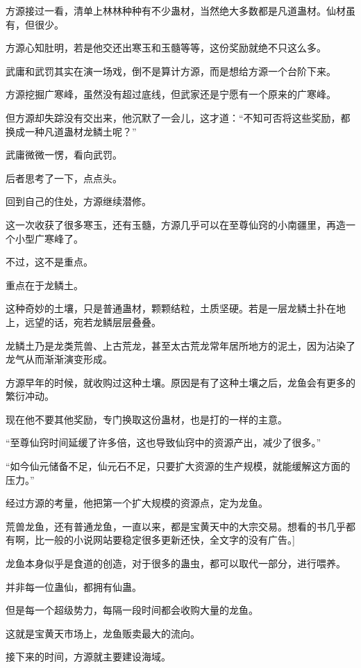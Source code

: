 
\begin{this_body}

方源接过一看，清单上林林种种有不少蛊材，当然绝大多数都是凡道蛊材。仙材虽有，但很少。

方源心知肚明，若是他交还出寒玉和玉髓等等，这份奖励就绝不只这么多。

武庸和武罚其实在演一场戏，倒不是算计方源，而是想给方源一个台阶下来。

方源挖掘广寒峰，虽然没有超过底线，但武家还是宁愿有一个原来的广寒峰。

但方源却失踪没有交出来，他沉默了一会儿，这才道：“不知可否将这些奖励，都换成一种凡道蛊材龙鳞土呢？”

武庸微微一愣，看向武罚。

后者思考了一下，点点头。

回到自己的住处，方源继续潜修。

这一次收获了很多寒玉，还有玉髓，方源几乎可以在至尊仙窍的小南疆里，再造一个小型广寒峰了。

不过，这不是重点。

重点在于龙鳞土。

这种奇妙的土壤，只是普通蛊材，颗颗结粒，土质坚硬。若是一层龙鳞土扑在地上，远望的话，宛若龙鳞层层叠叠。

龙鳞土乃是龙类荒兽、上古荒龙，甚至太古荒龙常年居所地方的泥土，因为沾染了龙气从而渐渐演变形成。

方源早年的时候，就收购过这种土壤。原因是有了这种土壤之后，龙鱼会有更多的繁衍冲动。

现在他不要其他奖励，专门换取这份蛊材，也是打的一样的主意。

“至尊仙窍时间延缓了许多倍，这也导致仙窍中的资源产出，减少了很多。”

“如今仙元储备不足，仙元石不足，只要扩大资源的生产规模，就能缓解这方面的压力。”

经过方源的考量，他把第一个扩大规模的资源点，定为龙鱼。

荒兽龙鱼，还有普通龙鱼，一直以来，都是宝黄天中的大宗交易。想看的书几乎都有啊，比一般的小说网站要稳定很多更新还快，全文字的没有广告。]

龙鱼本身似乎是食道的创造，对于很多的蛊虫，都可以取代一部分，进行喂养。

并非每一位蛊仙，都拥有仙蛊。

但是每一个超级势力，每隔一段时间都会收购大量的龙鱼。

这就是宝黄天市场上，龙鱼贩卖最大的流向。

接下来的时间，方源就主要建设海域。


\end{this_body}
